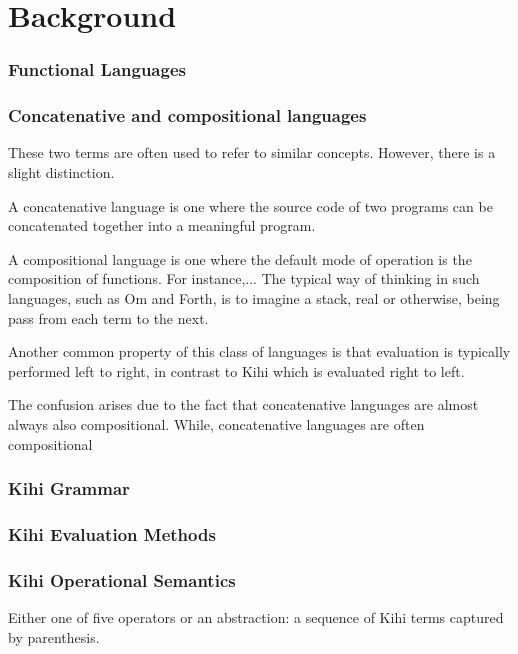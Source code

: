 \chapter{Background} \label{C:background} 



\subsection{Functional Languages}

\subsection{Concatenative and compositional languages}
These two terms are often used to refer to similar concepts. However,
there is a slight distinction.

A concatenative language is one where the source code of two
programs can be concatenated together into a meaningful program.

A compositional language is one where the default mode of operation
is the composition of functions. For instance,...
The typical way of thinking in such languages, such as Om and Forth,
is to imagine a stack, real or otherwise, being pass from each term
to the next.

Another common property of this class of languages is that evaluation
is typically performed left to right, in contrast to Kihi which is
evaluated right to left.

The confusion arises due to the fact that concatenative languages are
almost always also compositional.
While, concatenative languages are often compositional 


\subsection{Kihi Grammar}

\subsection{Kihi Evaluation Methods}

\subsection{Kihi Operational Semantics}



Either
one of five operators or an abstraction: a sequence of Kihi terms
captured by parenthesis. 

